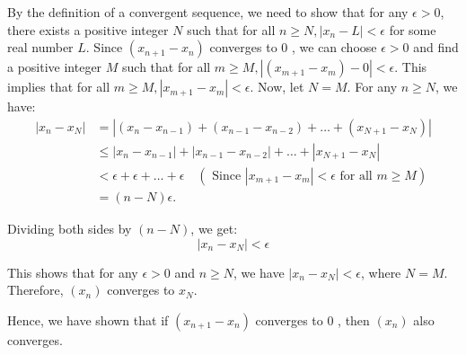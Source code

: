 \documentclass{report}
\begin{document}
\bigskip
{}
By the definition of a convergent sequence, we need to show that for any $\epsilon>0$, there exists a positive integer $N$ such that for all $n \geq N,\left|x_n-L\right|<\epsilon$ for some real number $L$.
Since $\left(x_{n+1}-x_n\right)$ converges to 0 , we can choose $\epsilon>0$ and find a positive integer $M$ such that for all $m \geq M,\left|\left(x_{m+1}-x_m\right)-0\right|<\epsilon$. This implies that for all $m \geq M,\left|x_{m+1}-x_m\right|<\epsilon$.
Now, let $N=M$. For any $n \geq N$, we have:
$$
\begin{aligned}
\left|x_n-x_N\right| & =\left|\left(x_n-x_{n-1}\right)+\left(x_{n-1}-x_{n-2}\right)+\ldots+\left(x_{N+1}-x_N\right)\right| \\
& \leq\left|x_n-x_{n-1}\right|+\left|x_{n-1}-x_{n-2}\right|+\ldots+\left|x_{N+1}-x_N\right| \\
& <\epsilon+\epsilon+\ldots+\epsilon \quad\left(\text { Since }\left|x_{m+1}-x_m\right|<\epsilon \text { for all } m \geq M\right) \\
& =(n-N) \epsilon .
\end{aligned}
$$

Dividing both sides by $(n-N)$, we get:
$$
\left|x_n-x_N\right|<\epsilon
$$

This shows that for any $\epsilon>0$ and $n \geq N$, we have $\left|x_n-x_N\right|<\epsilon$, where $N=M$. Therefore, $\left(x_n\right)$ converges to $x_N$.

Hence, we have shown that if $\left(x_{n+1}-x_n\right)$ converges to 0 , then $\left(x_n\right)$ also converges.
\end{document}
